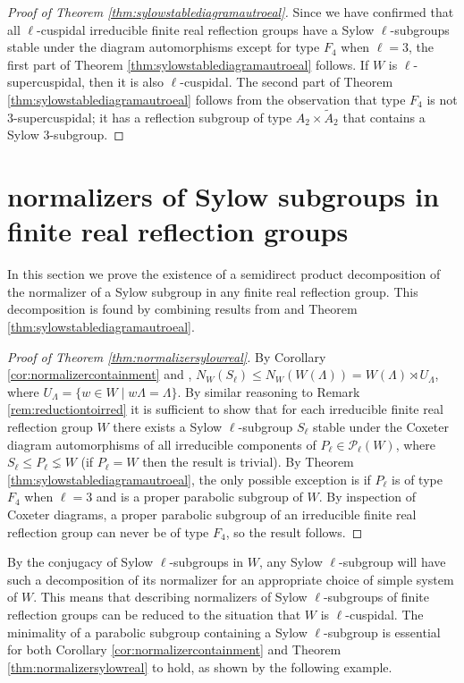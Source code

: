 \documentclass[12pt]{amsart}
\theoremstyle{plain}
\theoremstyle{definition}
\numberwithin{equation}{section}
\numberwithin{equation}{section}
\begin{document}
\begin{proof}[Proof of Theorem \ref{thm:sylowstablediagramautroeal}]
		Since we have confirmed that all $\ell$-cuspidal irreducible finite real reflection groups have a Sylow $\ell$-subgroups stable under the diagram automorphisms except for type $F_4$ when $\ell=3$, the first part of Theorem \ref{thm:sylowstablediagramautroeal} follows. If $W$ is $\ell$-supercuspidal, then it is also $\ell$-cuspidal. The second part of Theorem \ref{thm:sylowstablediagramautroeal} follows from the observation that type $F_4$ is not $3$-supercuspidal; it has a reflection subgroup of type $A_2\times \tilde{A}_2$ that contains a Sylow $3$-subgroup.
	\end{proof}
	
	
	
	\section{normalizers of Sylow subgroups in finite real reflection groups}\label{normalizersofsylowsubgroupsinreal}
	
	In this section we prove the existence of a semidirect product decomposition of the normalizer of a Sylow subgroup in any finite real reflection group. This decomposition is found by combining results from \cite{HOWLETT} and Theorem \ref{thm:sylowstablediagramautroeal}.
	
	
	
	\begin{proof}[Proof of Theorem \ref{thm:normalizersylowreal}]
		By Corollary \ref{cor:normalizercontainment} and \cite{HOWLETT}, $N_W(S_\ell)\leq N_W(W(\Lambda))=W(\Lambda)\rtimes U_\Lambda$, where $U_\Lambda=\{w\in W \mid w\Lambda=\Lambda\}$. By similar reasoning to Remark \ref{rem:reductiontoirred} it is sufficient to show that for each irreducible finite real reflection group $W$ there exists a Sylow $\ell$-subgroup $S_\ell$ stable under the Coxeter diagram automorphisms of all irreducible components of $P_\ell\in \mathcal{P}_\ell(W)$, where $S_\ell\leq P_\ell\lneq W$ (if $P_\ell=W$ then the result is trivial). By Theorem \ref{thm:sylowstablediagramautroeal}, the only possible exception is if $P_\ell$ is of type $F_4$ when $\ell=3$ and is a proper parabolic subgroup of $W$. By inspection of Coxeter diagrams, a proper parabolic subgroup of an irreducible finite real reflection group can never be of type $F_4$, so the result follows.
	\end{proof}
	
	By the conjugacy of Sylow $\ell$-subgroups in $W$, any Sylow $\ell$-subgroup will have such a decomposition of its normalizer for an appropriate choice of simple system of $W$. This means that describing normalizers of Sylow $\ell$-subgroups of finite reflection groups can be reduced to the situation that $W$ is $\ell$-cuspidal. The minimality of a parabolic subgroup containing a Sylow $\ell$-subgroup is essential for both Corollary \ref{cor:normalizercontainment} and Theorem \ref{thm:normalizersylowreal} to hold, as shown by the following example.
	
\end{document}
